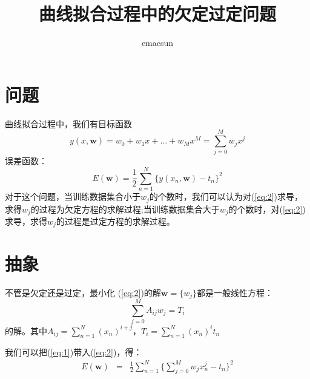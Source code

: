 \documentclass[10pt,a4paper,UTF8]{article}
\author{emacsun}
\date{}
\title{曲线拟合过程中的欠定过定问题}
\begin{document}
\maketitle
\tableofcontents
{}

\section{问题}
\label{sec:orged76f9a}


曲线拟合过程中，我们有目标函数
\begin{equation}
\label{eq:1}
y(x, \mathbf{w}) = w_{0} + w_{1}x + \ldots + w_{M}x^{M} = \sum_{j=0}^{M}w_{j}x^{j}
\end{equation}
误差函数：
\begin{equation}
\label{eq:2}
E( \mathbf{w}) = \frac{1}{2} \sum_{n=1}^{N}\{y(x_{n}, \mathbf{w}) - t_{n}\}^{2}
\end{equation}
对于这个问题，当训练数据集合小于\(w_{j}\)的个数时，我们可以认为对(\ref{eq:2})求导，求得\(w_{j}\)的过程为欠定方程的求解过程;当训练数据集合大于\(w_{j}\)的个数时，对(\ref{eq:2})求导，求得\(w_{j}\)的过程是过定方程的求解过程。

\section{抽象}
\label{sec:orgd418997}


不管是欠定还是过定，最小化 (\ref{eq:2})的解\(\mathbf{w} = \{w_{j}\}\)都是一般线性方程：\[\sum_{j=0}^{M}A_{ij}w_{j} = T_{i}\]的解。其中\(A_{ij} = \sum_{n=1}^{N}(x_{n})^{i+j}\)，\(T_{i} = \sum_{n=1}^{N}(x_{n})^{i}t_{n}\)


我们可以把(\ref{eq:1})带入(\ref{eq:2})，得：
\begin{eqnarray}
\label{eq:3}
E( \mathbf{w})&=&\frac{1}{2} \sum_{n=1}^{N}\{ \sum_{j=0}^{M}w_{j}x_{n}^{j} - t_{n}\}^{2} \\
\end{eqnarray}
\end{document}
